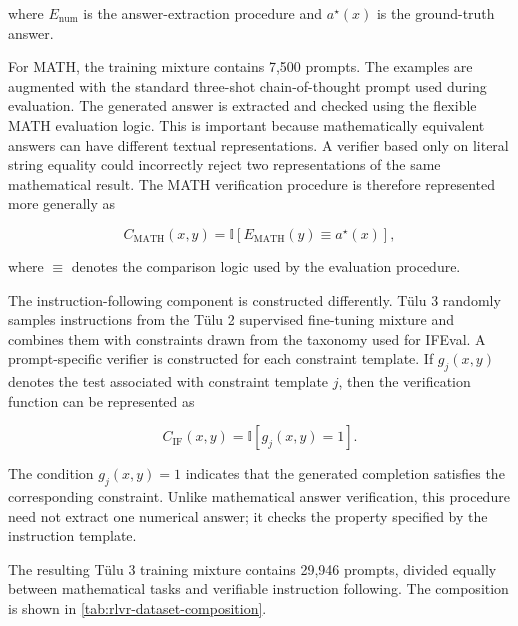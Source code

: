 where \(E_{\mathrm{num}}\) is the answer-extraction procedure and
\(a^\star(x)\) is the ground-truth answer.

For MATH, the training mixture contains 7,500 prompts. The examples are
augmented with the standard three-shot chain-of-thought prompt used during
evaluation. The generated answer is extracted and checked using the
flexible MATH evaluation logic. This is important because mathematically
equivalent answers can have different textual representations. A verifier
based only on literal string equality could incorrectly reject two
representations of the same mathematical result. The MATH verification
procedure is therefore represented more generally as

\begin{equation}
    C_{\mathrm{MATH}}(x,y)
    =
    \mathbb{I}
    \left[
        E_{\mathrm{MATH}}(y)
        \equiv a^\star(x)
    \right],
    \label{eq:rlvr-math-verifier}
\end{equation}

where \(\equiv\) denotes the comparison logic used by the evaluation
procedure.

The instruction-following component is constructed differently. Tülu 3
randomly samples instructions from the Tülu 2 supervised fine-tuning mixture
and combines them with constraints drawn from the taxonomy used for IFEval.
A prompt-specific verifier is constructed for each constraint template.
If \(g_j(x,y)\) denotes the test associated with constraint template \(j\),
then the verification function can be represented as

\begin{equation}
    C_{\mathrm{IF}}(x,y)
    =
    \mathbb{I}[g_j(x,y)=1].
    \label{eq:rlvr-if-verifier}
\end{equation}

The condition \(g_j(x,y)=1\) indicates that the generated completion
satisfies the corresponding constraint. Unlike mathematical answer
verification, this procedure need not extract one numerical answer; it
checks the property specified by the instruction template.

The resulting Tülu 3 training mixture contains 29,946 prompts, divided
equally between mathematical tasks and verifiable instruction following.
The composition is shown in \cref{tab:rlvr-dataset-composition}.

